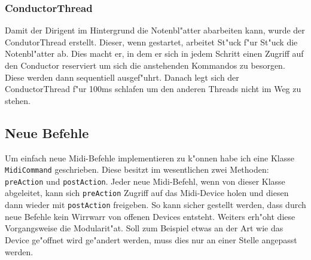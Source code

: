 \subsubsection{ConductorThread}
Damit der Dirigent im Hintergrund die Notenbl"atter abarbeiten kann, wurde der
CondutorThread erstellt. Dieser, wenn gestartet, arbeitet St"uck f"ur St"uck
die Notenbl"atter ab. Dies macht er, in dem er sich in jedem Schritt einen
Zugriff auf den Conductor reserviert um sich die anstehenden Kommandos zu besorgen.
Diese werden dann sequentiell ausgef"uhrt. Danach legt sich der ConductorThread
f"ur 100ms schlafen um den anderen Threads nicht im Weg zu stehen. 

\subsection{Neue Befehle}
Um einfach neue Midi-Befehle implementieren zu k"onnen habe ich eine Klasse
\lstinline|MidiCommand| geschrieben. Diese besitzt im wesentlichen zwei 
Methoden: \lstinline|preAction| und \lstinline|postAction|. Jeder neue Midi-Befehl,
wenn von dieser Klasse abgeleitet, kann sich \lstinline|preAction| Zugriff auf
das Midi-Device holen und diesen dann wieder mit \lstinline|postAction| freigeben.
So kann sicher gestellt werden, dass durch neue Befehle kein Wirrwarr von offenen
Devices entsteht. Weiters erh"oht diese Vorgangsweise die Modularit"at. Soll zum
Beispiel etwas an der Art wie das Device ge"offnet wird ge"andert werden, muss
dies nur an einer Stelle angepasst werden. 


